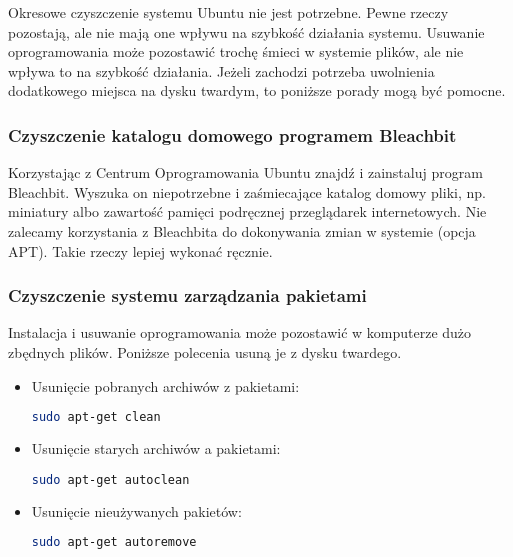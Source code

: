 Okresowe czyszczenie systemu Ubuntu nie jest potrzebne. Pewne rzeczy pozostają, ale nie mają one wpływu na szybkość działania systemu. Usuwanie oprogramowania może pozostawić trochę śmieci w systemie plików, ale nie wpływa to na szybkość działania. Jeżeli zachodzi potrzeba uwolnienia dodatkowego miejsca na dysku twardym, to poniższe porady mogą być pomocne.

\subsubsection{Czyszczenie katalogu domowego programem Bleachbit}
Korzystając z Centrum Oprogramowania Ubuntu znajdź i zainstaluj program \textcolor{ubuntu_orange}{Bleachbit}. Wyszuka on niepotrzebne i zaśmiecające katalog domowy pliki, np. miniatury albo zawartość pamięci podręcznej przeglądarek internetowych. Nie zalecamy korzystania z Bleachbita do dokonywania zmian w systemie (opcja APT). Takie rzeczy lepiej wykonać ręcznie.

\subsubsection{Czyszczenie systemu zarządzania pakietami}
Instalacja i usuwanie oprogramowania może pozostawić w komputerze dużo zbędnych plików. Poniższe polecenia usuną je z dysku twardego.
\begin{itemize}
\item Usunięcie pobranych archiwów z pakietami:
\begin{lstlisting}[language=bash]
sudo apt-get clean
\end{lstlisting}
\item Usunięcie starych archiwów a pakietami:
\begin{lstlisting}[language=bash]
sudo apt-get autoclean
\end{lstlisting}
\item Usunięcie nieużywanych pakietów:
\begin{lstlisting}[language=bash]
sudo apt-get autoremove
\end{lstlisting}
\end{itemize}

